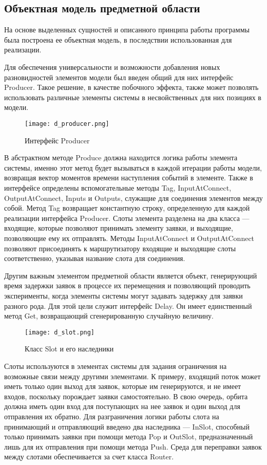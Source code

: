 \subsection{Объектная модель предметной области}
На основе выделенных сущностей и описанного принципа работы программы была построена ее объектная модель, в последствии использованная для реализации.

Для обеспечения универсальности и возможности добавления новых разновидностей элементов модели был введен общий для них интерфейс Producer. Такое решение, в качестве побочного эффекта, также может позволять использовать различные элементы системы в несвойственных для них позициях в модели.
\begin{figure}[H]
	\centering
	\texttt{[image: d\_producer.png]}
	\caption{Интерфейс Producer}
	\label{d_producer}
\end{figure}

В абстрактном методе Produce должна находится логика работы элемента системы, именно этот метод будет вызываться в каждой итерации работы модели, возвращая вектор моментов времени наступления событий в элементе. Также в интерфейсе определены вспомогательные методы Tag, InputAtConnect, OutputAtConnect, Inputs и Outputs, служащие для соединения элементов между собой. Метод Tag возвращает константную строку, определенную для каждой реализации интерфейса Producer. Слоты элемента разделена на два класса --- входящие, которые позволяют принимать элементу заявки, и выходящие, позволяющие ему их отправлять. Методы InputAtConnect и OutputAtConnect позволяют присоединять к маршрутизатору входящие и выходящие слоты соответственно, указывая название слота для соединения. 

Другим важным элементом предметной области является объект, генерирующий время задержки заявок в процессе их перемещения и позволяющий проводить эксперименты, когда элементы системы могут задавать задержку для заявки разного рода. Для этой цели служит интерфейс Delay. Он имеет единственный метод Get, возвращающий сгенерированную случайную величину.
\begin{figure}[H]
	\centering
	\texttt{[image: d\_slot.png]}
	\caption{Класс Slot и его наследники}
	\label{d_slot}
\end{figure}

Слоты используются в элементах системы для задания ограничения на возможные связи между другими элементами. К примеру, входящий поток может иметь только один выход для заявок, которые им генерируются, и не имеет входов, поскольку порождает заявки самостоятельно. В свою очередь, орбита должна иметь один вход для поступающих на нее заявок и один выход для отправления их обратно. Для разграничения логики работы слота на принимающий и отправляющий введено два наследника --- InSlot, способный только принимать заявки при помощи метода Pop и OutSlot, предназначенный лишь для их отправления при помощи метода Push. Среда для переправки заявок между слотами обеспечивается за счет класса Router.

